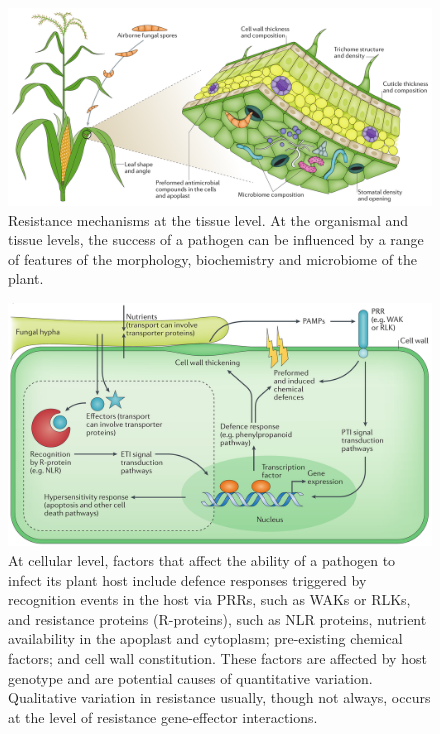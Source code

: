 \documentclass[10pt,dvipsnames,ignorenonframetext,aspectratio=169]{beamer}
\begin{document}
\begin{frame}{}
\protect\hypertarget{section-18}{}
\begin{figure}
\includegraphics[width=0.8\linewidth]{../images/infection_process_plants_extracellular} \caption{Resistance mechanisms at the tissue level. At the organismal and tissue levels, the success of a pathogen can be influenced by a range of features of the morphology, biochemistry and microbiome of the plant.}\label{fig:infection-mechanism-extracellular}
\end{figure}
\end{frame}

\begin{frame}{}
\protect\hypertarget{section-19}{}
\begin{figure}
\includegraphics[width=0.78\linewidth]{../images/infection_process_plants_intracellular} \caption{At cellular level, factors that affect the ability of a pathogen to infect its plant host include defence responses triggered by recognition events in the host via PRRs, such as WAKs or RLKs, and resistance proteins (R-proteins), such as NLR proteins, nutrient availability in the apoplast and cytoplasm; pre-existing chemical factors; and cell wall constitution. These factors are affected by host genotype and are potential causes of quantitative variation. Qualitative variation in resistance usually, though not always, occurs at the level of resistance gene-effector interactions.}\label{fig:infection-mechanism-intracellular}
\end{figure}
\end{frame}
\end{document}
